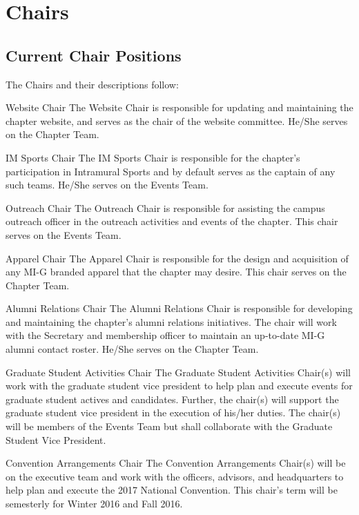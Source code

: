 \chapter{Chairs}\label{sec:Chairs} 
\section{Current Chair Positions} The Chairs and their descriptions follow:\\
\begin{enumsubsection}
\item{Website Chair} The Website Chair is responsible for updating and maintaining the chapter website, and serves as the chair of the website committee. He/She serves on the Chapter Team.
\item{IM Sports Chair} The IM Sports Chair is responsible for the chapter's participation in Intramural Sports and by default serves as the captain of any such teams. He/She serves on the Events Team.
\item{Outreach Chair} The Outreach Chair is responsible for assisting the
campus outreach officer in the outreach activities and events of the chapter. This chair serves on the Events Team.
\item{Apparel Chair} The Apparel Chair is responsible for the design and acquisition of any MI-G branded apparel that the chapter may desire. This chair serves on the Chapter Team.
\item{Alumni Relations Chair} The Alumni Relations Chair is responsible for developing and maintaining the chapter's alumni relations initiatives. The chair will work with the Secretary and membership officer to maintain an up-to-date MI-G alumni contact roster. He/She serves on the Chapter Team.
\item{Graduate Student Activities Chair} The Graduate Student Activities Chair(s) will work with the graduate student vice president to help plan and execute events for graduate student actives and candidates. Further, the chair(s) will support the graduate student vice president in the execution of his/her duties. The chair(s) will be members of the Events Team but shall collaborate with the Graduate Student Vice President.
\item{Convention Arrangements Chair} The Convention Arrangements Chair(s) will be on the executive team and work with the officers, advisors, and headquarters to help plan and execute the 2017 National Convention. This chair's term will be semesterly for Winter 2016 and Fall 2016.

\end{enumsubsection}
